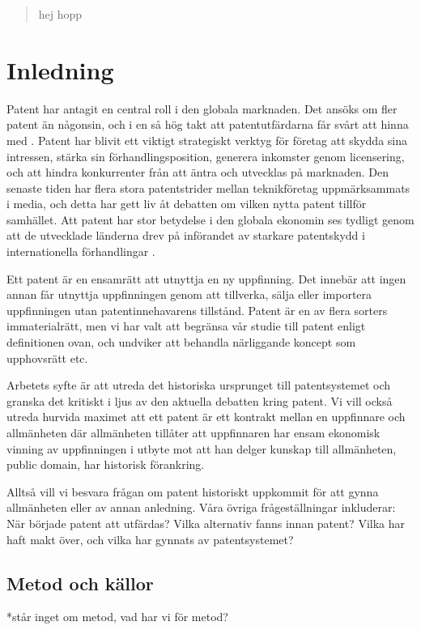 
\begin{abstract}
	hej hopp
\end{abstract}	
	
	
\section{Inledning}

Patent har antagit en central roll i den globala marknaden.
Det ansöks om fler patent än någonsin, och i en så hög takt att patentutfärdarna
får svårt att hinna med \cite{uspto_number}.
Patent har blivit ett viktigt strategiskt verktyg för företag att skydda sina
intressen, stärka sin förhandlingsposition, generera inkomster genom
licensering, och att hindra konkurrenter från att äntra och utvecklas på
marknaden. 
Den senaste tiden har flera stora patentstrider mellan teknikföretag
uppmärksammats i media, och detta har gett liv åt debatten om vilken nytta
patent tillför samhället.
Att patent har stor betydelse i den globala ekonomin ses tydligt genom att
de utvecklade länderna drev på införandet av starkare patentskydd i
internationella förhandlingar \cite{}. 

Ett patent är en ensamrätt att utnyttja en ny uppfinning. Det innebär att ingen
annan får utnyttja uppfinningen genom att tillverka, sälja eller importera 
uppfinningen utan patentinnehavarens tillstånd. Patent är en av flera sorters
immaterialrätt, men vi har valt att begränsa vår studie till patent enligt
definitionen ovan, och undviker att behandla närliggande koncept som upphovsrätt
etc.

Arbetets syfte är att utreda det historiska ursprunget till patentsystemet och
granska det kritiskt i ljus av den aktuella debatten kring patent.
Vi vill också utreda hurvida maximet att ett patent är ett kontrakt mellan en
uppfinnare och allmänheten där allmänheten tillåter att uppfinnaren har ensam
ekonomisk vinning av uppfinningen i utbyte mot att han delger kunskap till
allmänheten, public domain, har historisk förankring.

Alltså vill vi besvara frågan om patent historiskt uppkommit för att gynna
allmänheten eller av annan anledning. Våra övriga frågeställningar inkluderar:
När började patent att utfärdas? Vilka alternativ fanns innan patent?
Vilka har haft makt över, och vilka har gynnats av patentsystemet?


\subsection{Metod och källor}
*står inget om metod, vad har vi för metod?

